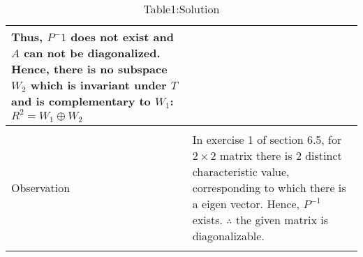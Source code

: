 \documentclass[journal,12pt,onecolumn]{IEEEtran}
\begin{document}
\begin{longtable}{|p{5cm}|p{13cm}|}
{ Thus, $P^-1$ does not exist and $A$ can not be diagonalized.\\ Hence, there is no subspace $W_2$ which is invariant under $T$ and is complementary to $W_1$:\\
$R^2=W_1\oplus W_2$\\}\\
\hline
& \\
Observation & 
\parbox{12cm}{In exercise 1 of section 6.5, for $2\times 2$ matrix there is 2 distinct characteristic value, corresponding to which there is a eigen vector. Hence, $P^{-1}$ exists. \\
$\therefore$ the given matrix is diagonalizable.\\}\\
\hline
\caption*{Table1:Solution}
\end{longtable}
\end{document}
